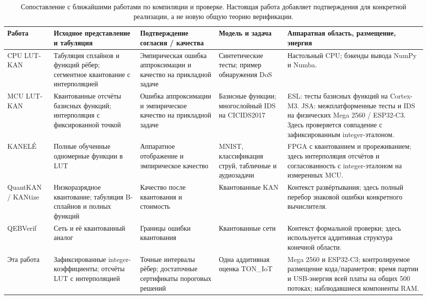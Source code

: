 \begin{table}[!htbp]
\caption{Сопоставление с ближайшими работами по компиляции и проверке. Настоящая работа добавляет подтверждения для конкретной реализации, а не новую общую теорию верификации.}
\label{tab:related-work}
\centering\scriptsize\setlength{\tabcolsep}{3pt}
\begin{tabular}{>{\RaggedRight\arraybackslash}p{2.2cm}>{\RaggedRight\arraybackslash}p{3.25cm}>{\RaggedRight\arraybackslash}p{3.1cm}>{\RaggedRight\arraybackslash}p{2.6cm}>{\RaggedRight\arraybackslash}p{4.3cm}}
\toprule
Работа & Исходное представление и табуляция & Подтверждение согласия / качества & Модель и задача & Аппаратная область, размещение, энергия\\
\midrule
CPU LUT-KAN~\cite{kuznetsov2026toolkit} & Табуляция сплайнов и функций рёбер; сегментное квантование с интерполяцией & Эмпирическая ошибка аппроксимации и качество на прикладной задаче & Синтетические тесты; пример обнаружения DoS & Настольный CPU; бэкенды вывода NumPy и Numba.\\
MCU LUT-KAN~\cite{kuznetsov2026esl,kuznetsov2026mculut} & Квантованные отсчёты базисных функций; интерполяция с фиксированной точкой & Ошибка аппроксимации и эмпирическое качество на прикладной задаче & Базисные функции; многослойный IDS на CICIDS2017 & ESL: тесты базисных функций на Cortex-M3. JSA: межплатформенные тесты и IDS на физических Mega 2560 / ESP32-C3. Здесь проверяется совпадение с зафиксированным integer-эталоном.\\
KANEL\'{E}~\cite{Hoang2025KANELE} & Полные обученные одномерные функции в LUT & Аппаратное отображение и эмпирическое качество & MNIST, классификация струй, табличные и аудиозадачи & FPGA с квантованием и прореживанием; здесь интерполяция отсчётов и согласованность с integer-эталоном на измеренных MCU.\\
QuantKAN / KANtize~\cite{fuad2025quantkan,errabii2026kantize} & Низкоразрядное квантование; табуляция B-сплайнов и полных функций & Качество после квантования и стоимость & Квантованные KAN & Контекст развёртывания; здесь полный перебор знаковой ошибки конкретного вычислителя.\\
QEBVerif~\cite{zhang2023qebverif} & Сеть и её квантованный аналог & Границы ошибки квантования & Квантованные сети & Контекст формальной проверки; здесь используется аддитивная структура конечной области.\\
Эта работа & Зафиксированные integer-коэффициенты; отсчёты LUT с интерполяцией & Точные интервалы рёбер; достаточные сертификаты пороговых решений & Одна аддитивная оценка TON\_IoT & Mega 2560 и ESP32-C3; контролируемое размещение кода/параметров; время партии и USB-энергия всей платы на общих 500 потоках; наблюдавшиеся компоненты RAM.\\
\bottomrule
\end{tabular}
\end{table}
